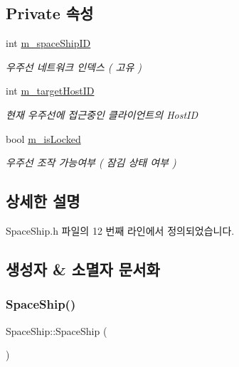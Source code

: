 \subsection*{Private 속성}
\begin{DoxyCompactItemize}
\item 
int \hyperlink{class_space_ship_a03b4dcfdfa8771db1e462eb6b9b15055}{m\+\_\+space\+Ship\+ID}
\begin{DoxyCompactList}\small\item\em 우주선 네트워크 인덱스 ( 고유 ) \end{DoxyCompactList}\item 
int \hyperlink{class_space_ship_a7b8bd199405824c96906094a2e1312c6}{m\+\_\+target\+Host\+ID}
\begin{DoxyCompactList}\small\item\em 현재 우주선에 접근중인 클라이언트의 Host\+ID \end{DoxyCompactList}\item 
bool \hyperlink{class_space_ship_afc1bca7c7439f00cd66b4f415e76f0f6}{m\+\_\+is\+Locked}
\begin{DoxyCompactList}\small\item\em 우주선 조작 가능여부 ( 잠김 상태 여부 ) \end{DoxyCompactList}\end{DoxyCompactItemize}


\subsection{상세한 설명}


Space\+Ship.\+h 파일의 12 번째 라인에서 정의되었습니다.



\subsection{생성자 \& 소멸자 문서화}
\mbox{\label{class_space_ship_ae56e545157e761155089250245ad3455}} 
\subsubsection{\texorpdfstring{Space\+Ship()}{SpaceShip()}}
{\footnotesize\ttfamily Space\+Ship\+::\+Space\+Ship (\begin{DoxyParamCaption}{ }\end{DoxyParamCaption})}



